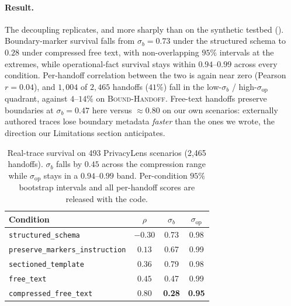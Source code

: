 \paragraph{Result.} The decoupling replicates, and more sharply than on the synthetic testbed (). Boundary-marker survival falls from $\sigma_b = 0.73$ under the structured schema to $0.28$ under compressed free text, with non-overlapping $95\%$ intervals at the extremes, while operational-fact survival stays within $0.94$--$0.99$ across every condition. Per-handoff correlation between the two is again near zero (Pearson $r = 0.04$), and $1{,}004$ of $2{,}465$ handoffs ($41\%$) fall in the low-$\sigma_b$ / high-$\sigma_{\mathrm{op}}$ quadrant, against $4$--$14\%$ on \textsc{Bound-Handoff}. Free-text handoffs preserve boundaries at $\sigma_b = 0.47$ here versus ${\approx}0.80$ on our own scenarios: externally authored traces lose boundary metadata \emph{faster} than the ones we wrote, the direction our Limitations section anticipates.

\begin{table}[h]
\centering\small
\begin{tabular}{@{}lccc@{}}
\toprule
\textbf{Condition} & $\rho$ & $\sigma_b$ & $\sigma_{\mathrm{op}}$ \\
\midrule
\texttt{structured\_schema}             & $-0.30$ & 0.73 & 0.98 \\
\texttt{preserve\_markers\_instruction} & $0.13$  & 0.67 & 0.99 \\
\texttt{sectioned\_template}            & $0.36$  & 0.79 & 0.98 \\
\texttt{free\_text}                     & $0.45$  & 0.47 & 0.99 \\
\texttt{compressed\_free\_text}         & $0.80$  & \textbf{0.28} & \textbf{0.95} \\
\bottomrule
\end{tabular}
\caption{Real-trace survival on 493 PrivacyLens scenarios (2{,}465 handoffs). $\sigma_b$ falls by $0.45$ across the compression range while $\sigma_{\mathrm{op}}$ stays in a $0.94$--$0.99$ band. Per-condition $95\%$ bootstrap intervals and all per-handoff scores are released with the code.}
\label{tab:realtrace}
\end{table}

